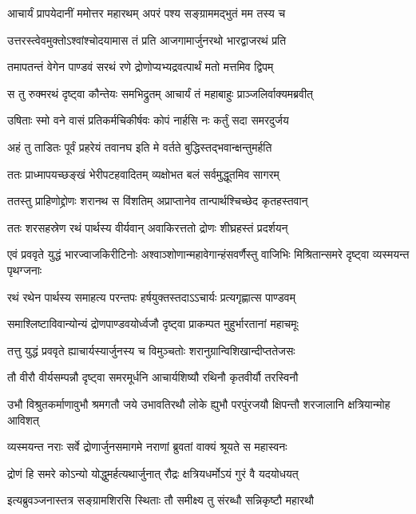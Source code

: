 \twolineshloka
{आचार्यं प्रापयेदानीं ममोत्तर महारथम्}
{अपरं पश्य सङ्ग्राममद्भुतं मम तस्य च}


\twolineshloka
{उत्तरस्त्वेवमुक्तोऽश्वांश्चोदयामास तं प्रति}
{आजगामार्जुनरथो भारद्वाजरथं प्रति}


\twolineshloka
{तमापतन्तं वेगेन पाण्डवं सरथं रणे}
{द्रोणोप्यभ्यद्रवत्पार्थं मतो मत्तमिव द्विपम्}


\twolineshloka
{स तु रुक्मरथं दृष्ट्वा कौन्तेयः समभिद्रुतम्}
{आचार्यं तं महाबाहुः प्राञ्जलिर्वाक्यमब्रवीत्}


\twolineshloka
{उषिताः स्मो वने वासं प्रतिकर्मचिकीर्षवः}
{कोपं नार्हसि नः कर्तुं सदा समरदुर्जय}


\twolineshloka
{अहं तु ताडितः पूर्वं प्रहरेयं तवानघ}
{इति मे वर्तते बुद्धिस्तद्भवान्क्षन्तुमर्हति}


\twolineshloka
{ततः प्राध्मापयच्छङ्खं भेरीपटहवादितम्}
{व्यक्षोभत बलं सर्वमुद्धूतमिव सागरम्}



\twolineshloka
{ततस्तु प्राहिणोद्द्रोणः शरानथ स विंशतिम्}
{अप्राप्तानेव तान्पार्थश्चिच्छेद कृतहस्तवान्}


\twolineshloka
{ततः शरसहस्रेण रथं पार्थस्य वीर्यवान्}
{अवाकिरत्ततो द्रोणः शीघ्रहस्तं प्रदर्शयन्}


\onelineshloka
{एवं प्रववृते युद्धं भारज्वाजकिरीटिनोः}
\twolineshloka
{अश्वाञ्शोणान्महावेगान्हंसवर्णैस्तु वाजिभिः}
{मिश्रितान्समरे दृष्ट्वा व्यस्मयन्त पृथग्जनाः}


\twolineshloka
{रथं रथेन पार्थस्य समाहत्य परन्तपः}
{हर्षयुक्तस्तदाऽऽचार्यः प्रत्यगृह्णात्स पाण्डवम्}


\twolineshloka
{समाश्लिष्टाविवान्योन्यं द्रोणपाण्डवयोर्ध्वजौ}
{दृष्ट्वा प्राकम्पत मुहुर्भारतानां महाचमूः}


\twolineshloka
{तत्तु युद्धं प्रववृते ह्याचार्यस्यार्जुनस्य च}
{विमुञ्चतोः शरानुग्रान्विशिखान्दीप्ततेजसः}


\twolineshloka
{तौ वीरौ वीर्यसम्पन्नौ दृष्ट्वा समरमूर्धनि}
{आचार्यशिष्यौ रथिनौ कृतवीर्यौ तरस्विनौ}


\threelineshloka
{उभौ विश्रुतकर्माणावुभौ श्रमगतौ जये}
{उभावतिरथौ लोके ह्युभौ परपुंरजयौ}
{क्षिपन्तौ शरजालानि क्षत्रियान्मोह आविशत्}


\twolineshloka
{व्यस्मयन्त नराः सर्वे द्रोणार्जुनसमागमे}
{नराणां ब्रुवतां वाक्यं श्रूयते स महास्वनः}


\twolineshloka
{द्रोणं हि समरे कोऽन्यो योद्धुमर्हत्यथार्जुनात्}
{रौद्रः क्षत्रियधर्मोऽयं गुरं वै यदयोधयत्}


\twolineshloka
{इत्यब्रुवञ्जनास्तत्र सङ्ग्रामशिरसि स्थिताः}
{तौ समीक्ष्य तु संरब्धौ सन्निकृष्टौ महारथौ}


